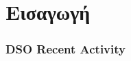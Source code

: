 \graphicspath{{Chapter1/Figs/}}

\section{Εισαγωγή}

\begin{frame}\frametitle{DSO Recent Activity}\framesubtitle{}\label{}
\vskip-1.5cm


\end{frame}
